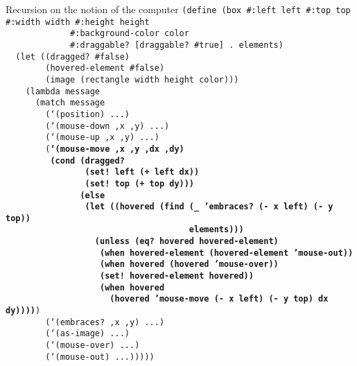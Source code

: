 \begin{frame}{Recursion on the notion of the computer}
  \tiny
  \texttt{(define (box \#:left left \#:top top \#:width width \#:height height\\
    \ \ \ \ \ \ \ \ \ \ \ \ \ \#:background-color color\\
    \ \ \ \ \ \ \ \ \ \ \ \ \ \#:draggable? [draggable? \#true] . elements)\\
    \ \ (let ((dragged? \#false)\\
    \ \ \ \ \ \ \ \ (hovered-element \#false)\\
    \ \ \ \ \ \ \ \ (image (rectangle width height color)))\\
    \ \ \ \ (lambda message\\
    \ \ \ \ \ \ (match message\\
    \ \ \ \ \ \ \ \ (`(position) ...)\\
    \ \ \ \ \ \ \ \ (`(mouse-down ,x ,y) ...)\\
    \ \ \ \ \ \ \ \ (`(mouse-up ,x ,y) ...)\\
    \ \ \ \ \ \ \ \ (\textbf{`(mouse-move ,x ,y ,dx ,dy)\\
      \ \ \ \ \ \ \ \ \ (cond (dragged?\\
      \ \ \ \ \ \ \ \ \ \ \ \ \ \ \ \ (set!\ left (+ left dx))\\
      \ \ \ \ \ \ \ \ \ \ \ \ \ \ \ \ (set!\ top (+ top dy)))\\
      \ \ \ \ \ \ \ \ \ \ \ \ \ \ \ (else\\
      \ \ \ \ \ \ \ \ \ \ \ \ \ \ \ \ (let ((hovered (find (\_ 'embraces?\ (- x left) (- y top))\\
      \ \ \ \ \ \ \ \ \ \ \ \ \ \ \ \ \ \ \ \ \ \ \ \ \ \ \ \ \ \ \ \ \ \ \ \ \ elements)))\\
      \ \ \ \ \ \ \ \ \ \ \ \ \ \ \ \ \ \ (unless (eq?\ hovered hovered-element)\\
      \ \ \ \ \ \ \ \ \ \ \ \ \ \ \ \ \ \ \ (when hovered-element (hovered-element 'mouse-out))\\
      \ \ \ \ \ \ \ \ \ \ \ \ \ \ \ \ \ \ \ (when hovered (hovered 'mouse-over))\\
      \ \ \ \ \ \ \ \ \ \ \ \ \ \ \ \ \ \ \ (set!\ hovered-element hovered))\\
      \ \ \ \ \ \ \ \ \ \ \ \ \ \ \ \ \ \ \ (when hovered \\
      \ \ \ \ \ \ \ \ \ \ \ \ \ \ \ \ \ \ \ \ \ (hovered 'mouse-move (- x left) (- y top) dx dy))))})\\
    \ \ \ \ \ \ \ \ (`(embraces? ,x ,y) ...)\\
    \ \ \ \ \ \ \ \ (`(as-image) ...)\\
    \ \ \ \ \ \ \ \ (`(mouse-over) ...)\\
    \ \ \ \ \ \ \ \ (`(mouse-out) ...)))))
    }
\end{frame}

